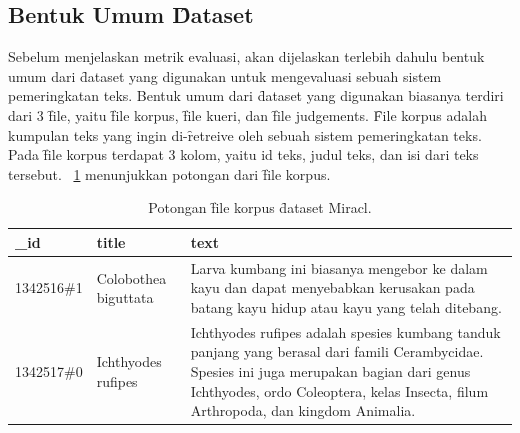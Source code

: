     \subsection{Bentuk Umum \f{Dataset}}
    \label{sec:dataset-umum}
    Sebelum menjelaskan metrik evaluasi, akan dijelaskan terlebih dahulu bentuk umum dari \f{dataset} yang digunakan untuk mengevaluasi sebuah sistem pemeringkatan teks. Bentuk umum dari \f{dataset} yang digunakan biasanya terdiri dari 3 \f{file}, yaitu \f{file} korpus, \f{file} kueri, dan \f{file judgements}. \f{File} korpus adalah kumpulan teks yang ingin di-\f{retreive} oleh sebuah sistem pemeringkatan teks. Pada \f{file} korpus terdapat 3 kolom, yaitu id teks, judul teks, dan isi dari teks tersebut. \tab~\ref{tab:contoh-file-korpus} menunjukkan potongan dari \f{file} korpus.
    \begin{table}
        \centering
        \caption{Potongan \f{file} korpus \f{dataset} Miracl.}
        \label{tab:contoh-file-korpus}
        \begin{tabular}{|l|l|p{}|}
            \hline
            \textbf{\_id}    & \textbf{title}             & \textbf{text}                                                                                                 \\ \hline
            1342516\#1  & Colobothea biguttata & Larva kumbang ini biasanya mengebor ke dalam kayu dan dapat menyebabkan kerusakan pada batang kayu hidup atau kayu yang telah ditebang. \\ \hline
            1342517\#0  & Ichthyodes rufipes  & Ichthyodes rufipes adalah spesies kumbang tanduk panjang yang berasal dari famili Cerambycidae. Spesies ini juga merupakan bagian dari genus Ichthyodes, ordo Coleoptera, kelas Insecta, filum Arthropoda, dan kingdom Animalia. \\ \hline
        \end{tabular}
    \end{table}

